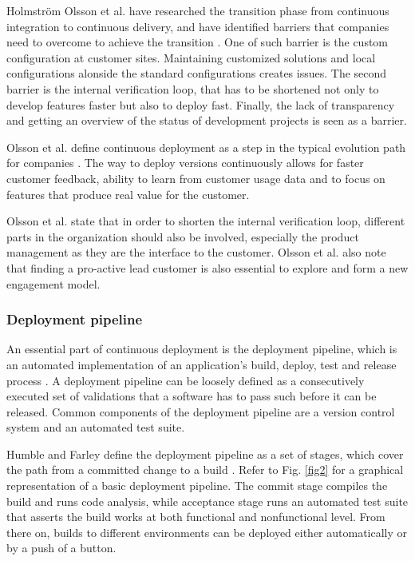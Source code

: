 \documentclass[english]{tktltiki2}
\theoremstyle{definition}
\theoremstyle{remark}
\begin{document}
Holmström Olsson et al. have researched the transition phase from continuous integration to continuous delivery, and have identified barriers that companies need to overcome to achieve the transition \cite{olsson2012climbing}. One of such barrier is the custom configuration at customer sites. Maintaining customized solutions and local configurations alonside the standard configurations creates issues. The second barrier is the internal verification loop, that has to be shortened not only to develop features faster but also to deploy fast. Finally, the lack of transparency and getting an overview of the status of development projects is seen as a barrier.

Olsson et al. define continuous deployment as a step in the typical evolution path for companies \cite{olsson2012climbing}. The way to deploy versions continuously allows for faster customer feedback, ability to learn from customer usage data and to focus on features that produce real value for the customer.  

Olsson et al. state that in order to shorten the internal verification loop, different parts in the organization should also be involved, especially the product management as they are the interface to the customer. Olsson et al. also note that finding a pro-active lead customer is also essential to explore and form a new engagement model.

\subsubsection{Deployment pipeline}
An essential part of continuous deployment is the deployment pipeline, which is an automated implementation of an application's build, deploy, test and release process \cite{cdbook}. A deployment pipeline can be loosely defined as a consecutively executed set of validations that a software has to pass such before it can be released. Common components of the deployment pipeline are a version control system and an automated test suite.

Humble and Farley define the deployment pipeline as a set of stages, which cover the path from a committed change to a build \cite{cdbook}. Refer to Fig. \ref{fig2} for a graphical representation of a basic deployment pipeline. The commit stage compiles the build and runs code analysis, while acceptance stage runs an automated test suite that asserts the build works at both functional and nonfunctional level. From there on, builds to different environments can be deployed either automatically or by a push of a button.
\end{document}

